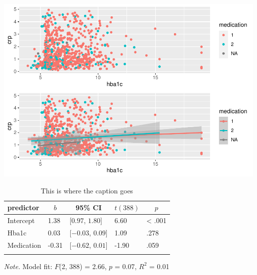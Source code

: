 \documentclass[
  man,floatsintext]{apa6}
\begin{document}
\includegraphics{Final_Groupof5_files/figure-latex/Reg1_HBA1C-CRP-1.pdf}

\begin{table}[tbp]

\begin{center}
\begin{threeparttable}

\caption{\label{tab:Table for Mreg1}This is where the caption goes}

\begin{tabular}{lllll}
\toprule
predictor & \multicolumn{1}{c}{$b$} & \multicolumn{1}{c}{95\% CI} & \multicolumn{1}{c}{$t(388)$} & \multicolumn{1}{c}{$p$}\\
\midrule
Intercept & 1.38 & $[0.97$, $1.80]$ & 6.60 & < .001\\
Hba1c & 0.03 & $[-0.03$, $0.09]$ & 1.09 & .278\\
Medication & -0.31 & $[-0.62$, $0.01]$ & -1.90 & .059\\
\bottomrule
\addlinespace
\end{tabular}

\begin{tablenotes}[para]
\normalsize{\textit{Note.} Model fit: $F$(2, 388) = 2.66, $p$ = 0.07, $R^2$ = 0.01}
\end{tablenotes}

\end{threeparttable}
\end{center}

\end{table}
\end{document}
